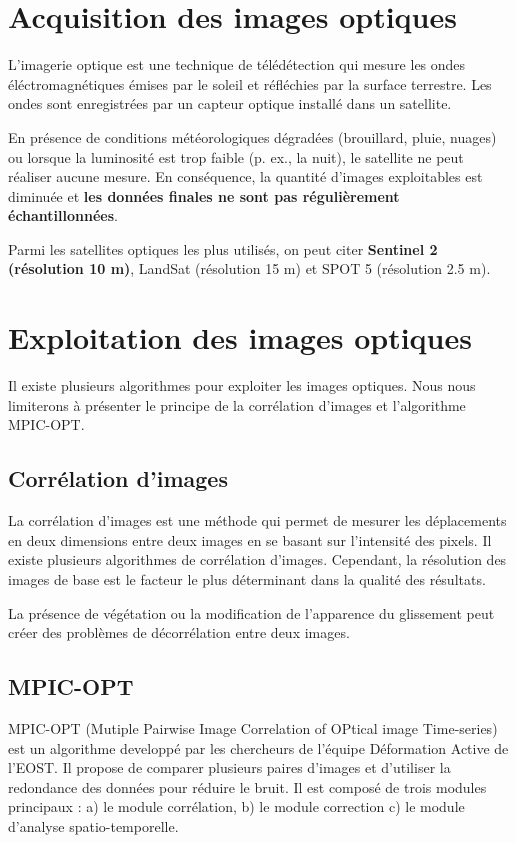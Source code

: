 \documentclass[11pt, openany]{report}
\begin{document}
\section{Acquisition des images optiques}
L'imagerie optique est une technique de télédétection qui mesure les ondes éléctromagnétiques émises par le soleil et réfléchies par la surface terrestre. Les ondes sont enregistrées par un capteur optique installé dans un satellite.

En présence de conditions météorologiques dégradées (brouillard, pluie, nuages) ou lorsque la luminosité  est trop faible (p. ex., la nuit), le satellite ne peut réaliser aucune mesure. En conséquence, la quantité d'images exploitables est diminuée et \textbf{les données finales ne sont pas régulièrement échantillonnées}.

Parmi les satellites optiques les plus utilisés, on peut citer \textbf{Sentinel 2 (résolution 10 m)}, LandSat (résolution 15 m) et SPOT 5 (résolution 2.5 m).

\section{Exploitation des images optiques}
Il existe plusieurs algorithmes pour exploiter les images optiques. Nous nous limiterons à présenter le principe de la corrélation d'images et l'algorithme MPIC-OPT.
\subsection{Corrélation d'images}
La corrélation d'images est une méthode qui permet de mesurer les déplacements en deux dimensions entre deux images en se basant sur l'intensité des pixels. Il existe plusieurs algorithmes de corrélation d'images. Cependant, la résolution des images de base est le facteur le plus déterminant dans la qualité des résultats.

La présence de végétation ou la modification de l'apparence du glissement peut créer des problèmes de décorrélation entre deux images.

\subsection{MPIC-OPT}
MPIC-OPT (Mutiple Pairwise Image Correlation of OPtical image Time-series) est un algorithme developpé par les chercheurs de l'équipe Déformation Active de l'EOST. Il propose de comparer plusieurs paires d’images et d’utiliser la redondance des données pour réduire le bruit. Il est composé de trois modules principaux : a) le module corrélation, b) le module correction c) le module d'analyse spatio-temporelle.
\end{document}
